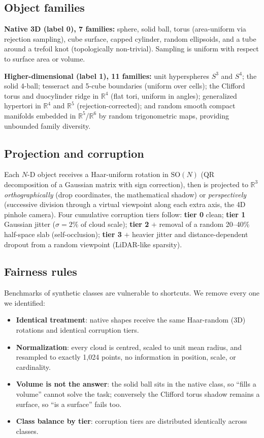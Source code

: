 \documentclass{article}
\begin{document}
\subsection{Object families}

\textbf{Native 3D (label 0), 7 families:} sphere, solid ball, torus (area-uniform via rejection sampling), cube surface, capped cylinder, random ellipsoids, and a tube around a trefoil knot (topologically non-trivial). Sampling is uniform with respect to surface area or volume.

\textbf{Higher-dimensional (label 1), 11 families:} unit hyperspheres $S^3$ and $S^4$; the solid 4-ball; tesseract and 5-cube boundaries (uniform over cells); the Clifford torus and duocylinder ridge in $\mathbb{R}^4$ (flat tori, uniform in angles); generalized hypertori in $\mathbb{R}^4$ and $\mathbb{R}^5$ (rejection-corrected); and random smooth compact manifolds embedded in $\mathbb{R}^5$/$\mathbb{R}^6$ by random trigonometric maps, providing unbounded family diversity.

\subsection{Projection and corruption}

Each $N$-D object receives a Haar-uniform rotation in $\mathrm{SO}(N)$ (QR decomposition of a Gaussian matrix with sign correction), then is projected to $\mathbb{R}^3$ \emph{orthographically} (drop coordinates, the mathematical shadow) or \emph{perspectively} (successive division through a virtual viewpoint along each extra axis, the 4D pinhole camera). Four cumulative corruption tiers follow: \textbf{tier 0} clean; \textbf{tier 1} Gaussian jitter ($\sigma = 2\%$ of cloud scale); \textbf{tier 2} $+$ removal of a random 20--40\% half-space slab (self-occlusion); \textbf{tier 3} $+$ heavier jitter and distance-dependent dropout from a random viewpoint (LiDAR-like sparsity).

\subsection{Fairness rules}
\label{sec:fairness}

Benchmarks of synthetic classes are vulnerable to shortcuts. We remove every one we identified:
\begin{itemize}
  \item \textbf{Identical treatment}: native shapes receive the same Haar-random (3D) rotations and identical corruption tiers.
  \item \textbf{Normalization}: every cloud is centred, scaled to unit mean radius, and resampled to exactly 1{,}024 points, no information in position, scale, or cardinality.
  \item \textbf{Volume is not the answer}: the solid ball sits in the native class, so ``fills a volume'' cannot solve the task; conversely the Clifford torus shadow remains a surface, so ``is a surface'' fails too.
  \item \textbf{Class balance by tier}: corruption tiers are distributed identically across classes.
\end{itemize}
\end{document}
